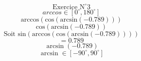 \documentclass{article}
\begin{document}
\[ \text{Exercice N}^\circ \text{3} \]
\[ arccos \in [0^\circ, 180^\circ] \]
\[ \text{arccos}(\text{cos}(\text{arcsin}(-0.789))) \]
\[ \text{cos}(\text{arcsin}(-0.789)) \]
\[ \text{Soit sin}(\text{arccos}(\text{cos}(\text{arcsin}(-0.789))))\]
\[ = 0.789 \]
\[ \arcsin(-0.789) \]
\[ \arcsin \in [-90^\circ, 90^\circ] \]
\end{document}
